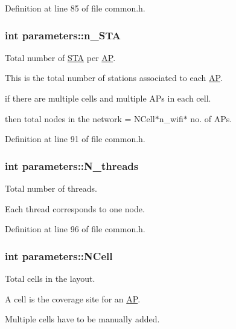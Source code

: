 Definition at line 85 of file common.\-h.

\hypertarget{structparameters_aa28e7a8ab695a9bf3056dc05d5cb916d}{
\subsubsection[{n\-\_\-\-S\-T\-A}]{\setlength{\rightskip}{0pt plus 5cm}int parameters\-::n\-\_\-\-S\-T\-A}}\label{structparameters_aa28e7a8ab695a9bf3056dc05d5cb916d}
Total number of \hyperlink{classSTA}{S\-T\-A} per \hyperlink{classAP}{A\-P}. \par
This is the total number of stations associated to each \hyperlink{classAP}{A\-P}. \par
if there are multiple cells and multiple A\-Ps in each cell. \par
then total nodes in the network = N\-Cell$\ast$n\-\_\-wifi$\ast$ no. of A\-Ps. \par


Definition at line 91 of file common.\-h.

\hypertarget{structparameters_a4c664752b1a78fe7f2cd8c5bb3b9e3a1}{
\subsubsection[{N\-\_\-threads}]{\setlength{\rightskip}{0pt plus 5cm}int parameters\-::\-N\-\_\-threads}}\label{structparameters_a4c664752b1a78fe7f2cd8c5bb3b9e3a1}
Total number of threads. \par
Each thread corresponds to one node. \par


Definition at line 96 of file common.\-h.

\hypertarget{structparameters_a220e9746ed9ebf49edc95c78721a245e}{
\subsubsection[{N\-Cell}]{\setlength{\rightskip}{0pt plus 5cm}int parameters\-::\-N\-Cell}}\label{structparameters_a220e9746ed9ebf49edc95c78721a245e}
Total cells in the layout. \par
A cell is the coverage site for an \hyperlink{classAP}{A\-P}. \par
Multiple cells have to be manually added. \par


